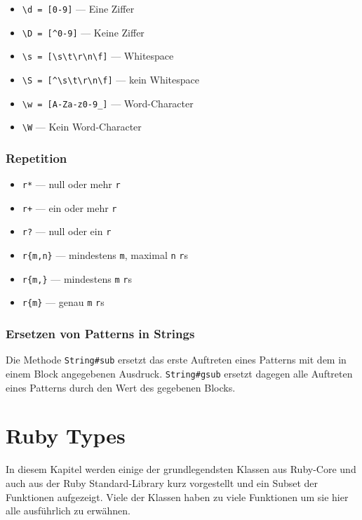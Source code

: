 \documentclass[a4book,11pt,twoside]{scrbook}
\begin{document}
\begin{itemize}
	\item \lstinline{\d = [0-9]} — Eine Ziffer
	\item \lstinline{\D = [^0-9]} — Keine Ziffer
	\item \lstinline{\s = [\s\t\r\n\f]} — Whitespace
	\item \lstinline{\S = [^\s\t\r\n\f]} — kein Whitespace
	\item \lstinline{\w = [A-Za-z0-9_]} — Word-Character
	\item \lstinline{\W} — Kein Word-Character
\end{itemize}

\subsection*{Repetition} %
\label{sub:repetition}
\begin{itemize}
	\item \texttt{r*} — null oder mehr \texttt{r}
	\item \texttt{r+} — ein oder mehr \texttt{r} 
	\item \texttt{r?} — null oder ein \texttt{r} 
	\item \texttt{r\{m,n\}} — mindestens \texttt{m}, maximal \texttt{n} \texttt{r}s
	\item \texttt{r\{m,\}} — mindestens \texttt{m} \texttt{r}s
	\item \texttt{r\{m\}} — genau \texttt{m} \texttt{r}s
\end{itemize}


\subsection*{Ersetzen von Patterns in Strings} %
\label{sub:ersetzen_von_patterns_in_strings}
Die Methode \texttt{String\#sub} ersetzt das erste Auftreten eines Patterns mit dem in einem Block angegebenen Ausdruck. \texttt{String\#gsub} ersetzt dagegen alle Auftreten eines Patterns durch den Wert des gegebenen Blocks.










\chapter{Ruby Types} %
\label{cha:ruby_types}
In diesem Kapitel werden einige der grundlegendsten Klassen aus Ruby-Core und auch aus der Ruby Standard-Library kurz vorgestellt und ein Subset der Funktionen aufgezeigt. Viele der Klassen haben zu viele Funktionen um sie hier alle ausführlich zu erwähnen.
\end{document}
